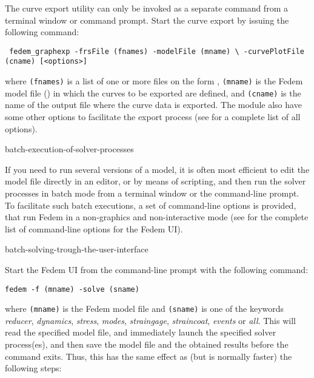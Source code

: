 The curve export utility can only be invoked as a separate command from
a terminal window or command prompt.
Start the curve export by issuing the following command:

\texttt{
  fedem\_graphexp -frsFile (fnames) -modelFile (mname) \textbackslash
  \newline\hspace*{32mm}
  -curvePlotFile (cname) [\textless options\textgreater]}

\noindent
where {\tt(fnames)} is a list of one or more  files on the form
, {\tt(mname)} is the Fedem model
file () in which the curves to be exported are defined, and
{\tt(cname)} is the name of the output file where the curve data is exported.
The module also have some other options to facilitate the export process
(see 
for a complete list of all options).


        {batch-execution-of-solver-processes}

If you need to run several versions of a model, it is often most efficient to
edit the model file directly in an editor, or by means of scripting, and then
run the solver processes in batch mode from a terminal window or the
command-line prompt. To facilitate such batch executions, a set of command-line
options is provided, that run Fedem in a non-graphics and non-interactive mode
(see  for the complete list
of command-line options for the Fedem UI).


           {batch-solving-trough-the-user-interface}

Start the Fedem UI from the command-line prompt with the following command:

\texttt{fedem -f (mname) -solve (sname)}

\noindent
where {\tt(mname)} is the Fedem model file and {\tt(sname)} is one of the
keywords {\sl reducer}, {\sl dynamics}, {\sl stress}, {\sl modes},
{\sl straingage}, {\sl straincoat}, {\sl events} or {\sl all}.
This will read the specified model file, and immediately launch the specified
solver process(es), and then save the model file and the obtained results before
the command exits.
Thus, this has the same effect as (but is normally faster) the following steps:

